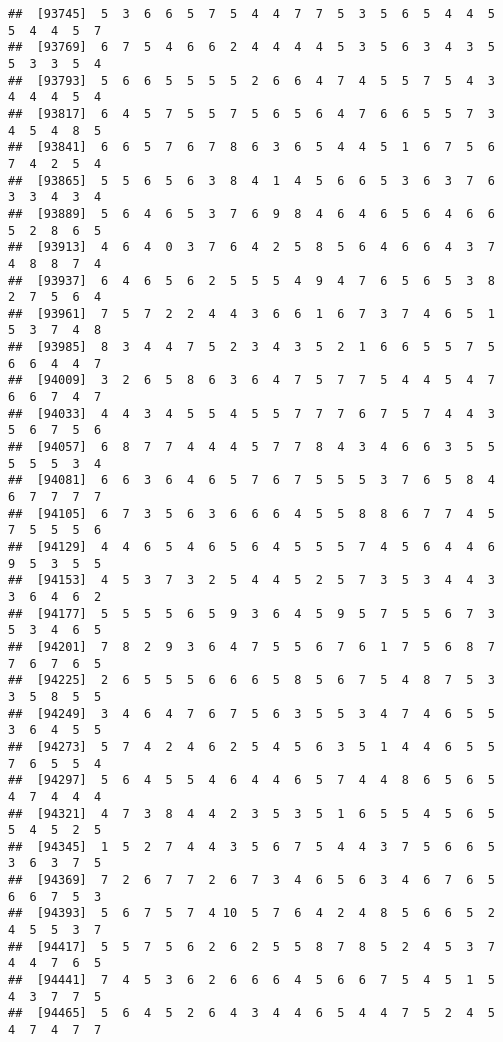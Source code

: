 \documentclass[
]{book}
\begin{document}
\begin{verbatim}
##  [93745]  5  3  6  6  5  7  5  4  4  7  7  5  3  5  6  5  4  4  5  5  4  4  5  7
##  [93769]  6  7  5  4  6  6  2  4  4  4  4  5  3  5  6  3  4  3  5  5  3  3  5  4
##  [93793]  5  6  6  5  5  5  5  2  6  6  4  7  4  5  5  7  5  4  3  4  4  4  5  4
##  [93817]  6  4  5  7  5  5  7  5  6  5  6  4  7  6  6  5  5  7  3  4  5  4  8  5
##  [93841]  6  6  5  7  6  7  8  6  3  6  5  4  4  5  1  6  7  5  6  7  4  2  5  4
##  [93865]  5  5  6  5  6  3  8  4  1  4  5  6  6  5  3  6  3  7  6  3  3  4  3  4
##  [93889]  5  6  4  6  5  3  7  6  9  8  4  6  4  6  5  6  4  6  6  5  2  8  6  5
##  [93913]  4  6  4  0  3  7  6  4  2  5  8  5  6  4  6  6  4  3  7  4  8  8  7  4
##  [93937]  6  4  6  5  6  2  5  5  5  4  9  4  7  6  5  6  5  3  8  2  7  5  6  4
##  [93961]  7  5  7  2  2  4  4  3  6  6  1  6  7  3  7  4  6  5  1  5  3  7  4  8
##  [93985]  8  3  4  4  7  5  2  3  4  3  5  2  1  6  6  5  5  7  5  6  6  4  4  7
##  [94009]  3  2  6  5  8  6  3  6  4  7  5  7  7  5  4  4  5  4  7  6  6  7  4  7
##  [94033]  4  4  3  4  5  5  4  5  5  7  7  7  6  7  5  7  4  4  3  5  6  7  5  6
##  [94057]  6  8  7  7  4  4  4  5  7  7  8  4  3  4  6  6  3  5  5  5  5  5  3  4
##  [94081]  6  6  3  6  4  6  5  7  6  7  5  5  5  3  7  6  5  8  4  6  7  7  7  7
##  [94105]  6  7  3  5  6  3  6  6  6  4  5  5  8  8  6  7  7  4  5  7  5  5  5  6
##  [94129]  4  4  6  5  4  6  5  6  4  5  5  5  7  4  5  6  4  4  6  9  5  3  5  5
##  [94153]  4  5  3  7  3  2  5  4  4  5  2  5  7  3  5  3  4  4  3  3  6  4  6  2
##  [94177]  5  5  5  5  6  5  9  3  6  4  5  9  5  7  5  5  6  7  3  5  3  4  6  5
##  [94201]  7  8  2  9  3  6  4  7  5  5  6  7  6  1  7  5  6  8  7  7  6  7  6  5
##  [94225]  2  6  5  5  5  6  6  6  5  8  5  6  7  5  4  8  7  5  3  3  5  8  5  5
##  [94249]  3  4  6  4  7  6  7  5  6  3  5  5  3  4  7  4  6  5  5  3  6  4  5  5
##  [94273]  5  7  4  2  4  6  2  5  4  5  6  3  5  1  4  4  6  5  5  7  6  5  5  4
##  [94297]  5  6  4  5  5  4  6  4  4  6  5  7  4  4  8  6  5  6  5  4  7  4  4  4
##  [94321]  4  7  3  8  4  4  2  3  5  3  5  1  6  5  5  4  5  6  5  5  4  5  2  5
##  [94345]  1  5  2  7  4  4  3  5  6  7  5  4  4  3  7  5  6  6  5  3  6  3  7  5
##  [94369]  7  2  6  7  7  2  6  7  3  4  6  5  6  3  4  6  7  6  5  6  6  7  5  3
##  [94393]  5  6  7  5  7  4 10  5  7  6  4  2  4  8  5  6  6  5  2  4  5  5  3  7
##  [94417]  5  5  7  5  6  2  6  2  5  5  8  7  8  5  2  4  5  3  7  4  4  7  6  5
##  [94441]  7  4  5  3  6  2  6  6  6  4  5  6  6  7  5  4  5  1  5  4  3  7  7  5
##  [94465]  5  6  4  5  2  6  4  3  4  4  6  5  4  4  7  5  2  4  5  4  7  4  7  7

\end{verbatim}
\end{document}
